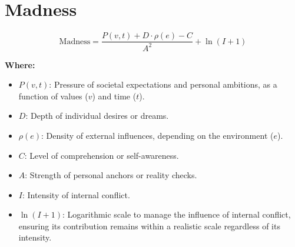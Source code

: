 \chapter{Madness}

\begin{equation}
\text{Madness} = \frac{P(v,t) + D \cdot \rho(e) - C}{A^2} + \ln{(I + 1)}
\end{equation}

\textbf{Where:}

\begin{itemize}
    \item $P(v,t)$: Pressure of societal expectations and personal ambitions, as a function of values ($v$) and time ($t$).
    \item $D$: Depth of individual desires or dreams.
    \item $\rho(e)$: Density of external influences, depending on the environment ($e$).
    \item $C$: Level of comprehension or self-awareness.
    \item $A$: Strength of personal anchors or reality checks.
    \item $I$: Intensity of internal conflict.
    \item $\ln{(I+1)}$: Logarithmic scale to manage the influence of internal conflict, ensuring its contribution remains within a realistic scale regardless of its intensity.
\end{itemize}